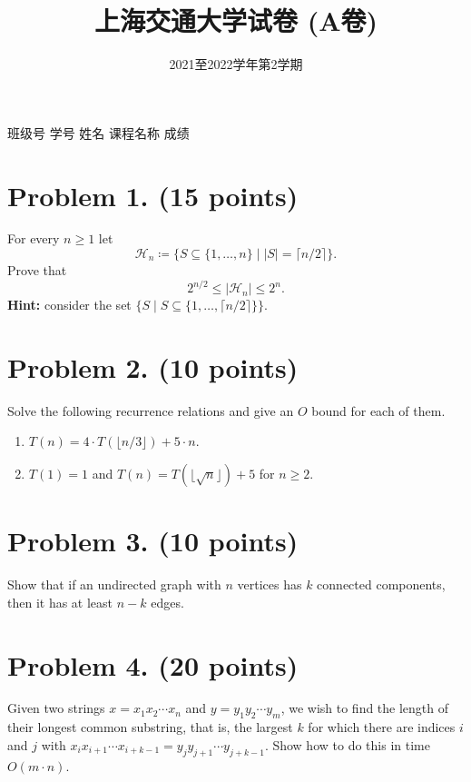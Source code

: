 \documentclass[11pt, a4paper]{article}
\title{上海交通大学试卷 (A卷)}
\author{2021至2022学年第2学期}
\date{}
\begin{document}
\maketitle

\noindent
班级号 \underline{\hspace{2cm}} \hspace{1cm} 学号 \underline{\hspace{2cm}} \hspace{1cm} 姓名 \underline{\hspace{2cm}} \hspace{1cm} 课程名称 \underline{\hspace{2cm}} \hspace{1cm} 成绩 \underline{\hspace{2cm}}

\section*{Problem 1. (15 points)}
For every \(n \geqslant 1\) let
\[ \mathcal{H}_n \coloneqq \{S \subseteq \{1, \ldots, n\} \mid |S| = \lceil n / 2 \rceil \}. \]
Prove that
\[ 2^{n / 2} \leqslant |\mathcal{H}_n| \leqslant 2^n. \]
\textbf{Hint:} consider the set \(\{S \mid S \subseteq \{1, \ldots, \lceil n / 2 \rceil \} \}\).

\section*{Problem 2. (10 points)}
Solve the following recurrence relations and give an \(O\) bound for each of them.

\begin{enumerate}[label=(\arabic*), leftmargin=*]
    \item \(T(n) = 4 \cdot T(\lfloor n / 3 \rfloor) + 5 \cdot n.\)
    \item \(T(1) = 1\) and \(T(n) = T(\lfloor \sqrt{n} \rfloor) + 5\) for \(n \geqslant 2\).
\end{enumerate}

\section*{Problem 3. (10 points)}
Show that if an undirected graph with \(n\) vertices has \(k\) connected components, then it has at least \(n - k\) edges.

\section*{Problem 4. (20 points)}
Given two strings \(x = x_1 x_2 \cdots x_n\) and \(y = y_1 y_2 \cdots y_m\), we wish to find the length of their longest common substring, that is, the largest \(k\) for which there are indices \(i\) and \(j\) with \(x_i x_{i+1} \cdots x_{i+k-1} = y_j y_{j+1} \cdots y_{j+k-1}\). Show how to do this in time \(O(m \cdot n)\).
\end{document}
